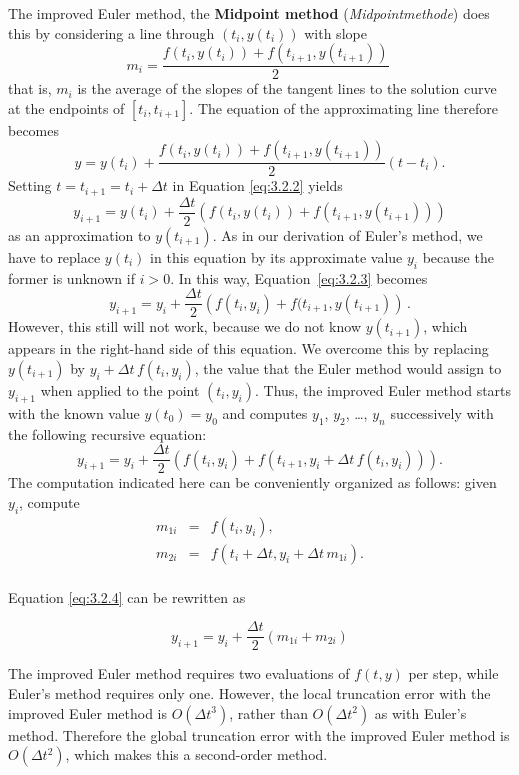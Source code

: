 The improved Euler method, the \textbf{Midpoint method} (\textit{Midpointmethode}) does this by considering a line through $(t_i,y(t_i))$ with
slope
$$
m_i=\dfrac{f(t_i,y(t_i))+f(t_{i+1},y(t_{i+1}))}{2}\;
$$
that is, $m_i$ is the average of the slopes of the tangent lines to the solution curve at the endpoints of $[t_i,t_{i+1}]$. The equation of the approximating line therefore becomes
\begin{equation} \label{eq:3.2.2}
y=y(t_i)+\dfrac{f(t_i,y(t_i))+f(t_{i+1},y(t_{i+1}))}{2}(t-t_i).
\end{equation}
Setting $t=t_{i+1}=t_i+\Delta t$ in Equation \eqref{eq:3.2.2} yields
\begin{equation} \label{eq:3.2.3}
y_{i+1}=y(t_i)+\dfrac{\Delta t}{2}\left(f(t_i,y(t_i))+f(t_{i+1},y(t_{i+1}))\right)
\end{equation}
as an approximation to $y(t_{i+1})$. As in our derivation of Euler's method, we have to replace $y(t_i)$ in this equation by its
approximate value $y_i$ because the former is unknown if $i>0$. In this way, Equation~\eqref{eq:3.2.3} becomes
$$
y_{i+1}=y_i+\dfrac{\Delta t}{2}\left(f(t_i,y_i)+f(t_{i+1},y(t_{i+1})\right)\,.
$$
However, this still will not work, because we do not know $y(t_{i+1})$, which appears in the right-hand side of this equation. We overcome this by replacing $y(t_{i+1})$ by $y_i+\Delta t\,f(t_i,y_i)$, the value that the  Euler method would assign to $y_{i+1}$ when applied to the point $(t_i,y_i)$. Thus,  the improved Euler method starts with the known value $y(t_0)=y_0$ and computes $y_1$, $y_2$, \dots, $y_n$ successively with the following recursive equation:
\begin{equation} \label{eq:3.2.4}
y_{i+1}=y_i+\dfrac{\Delta t}{2}\left(f(t_i,y_i)+f(t_{i+1},y_i+\Delta t\,f(t_i,y_i))\right).
\end{equation}
The computation indicated here can be conveniently organized as follows: given $y_i$, compute
\begin{eqnarray*}
m_{1i}&=&f(t_i,y_i),\\
m_{2i}&=&f\left(t_i+\Delta t,y_i+\Delta t\,m_{1i}\right).\\
\end{eqnarray*}

Equation \eqref{eq:3.2.4} can be rewritten as

\begin{equation} \label{eq:3.3.4}
y_{i+1}=y_i+\dfrac{\Delta t}{2}(m_{1i}+m_{2i})
\end{equation}

The improved Euler method requires two evaluations of $f(t,y)$ per step, while Euler's method requires only one.  However,  the local truncation error with the improved Euler method is $O\left(\Delta t^3\right)$, rather than $O\left(\Delta t^2\right)$ as with Euler's method. Therefore the global truncation error with the improved Euler method is $O\left(\Delta t^2\right)$, which makes this a second-order method.

